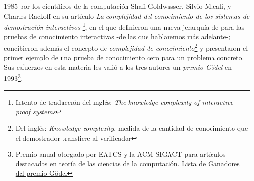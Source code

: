 \documentclass[oneside,10pt]{article}
\begin{document}
1985 por los científicos de la computación Shafi Goldwasser, Silvio Micali, y Charles Rackoff en su
artículo \textit{La complejidad del conocimiento de los sistemas de demostración interactivos}
\footnote{Intento de traducción del inglés: \textit{The knowledge complexity of interactive
    proof systems}}, en el que definieron una nueva jerarquía de para las pruebas de conocimiento
interactivas -de las que hablaremos más adelante-; concibieron además el concepto de
\textit{complejidad de conocimiento}\footnote{Del inglés: \textit{Knowledge complexity}, medida
  de la cantidad de conocimiento que el demostrador transfiere al verificador} y presentaron el primer
ejemplo de una prueba de conocimiento cero para un problema concreto. Sus esfuerzos en esta materia les valió a los tres autores un \textit{premio Gödel} en 1993\footnote{Premio anual otorgado por EATCS y la ACM SIGACT para artículos destacados en teoría de las ciencias de la computación. \href{https://en.wikipedia.org/wiki/G\%C3\%B6del\_Prize}{Lista de Ganadores del premio Gödel}}.
\end{document}
